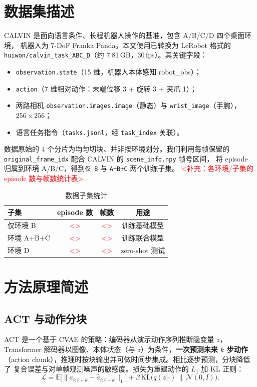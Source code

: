 \documentclass[11pt]{ctexart}
\begin{document}
\section{数据集描述}
CALVIN 是面向语言条件、长程机器人操作的基准，包含 A/B/C/D 四个桌面环境，
机器人为 7-DoF Franka Panda。本文使用已转换为 LeRobot 格式的
\texttt{huiwon/calvin\_task\_ABC\_D}（约 7.81\,GB，30\,fps）。其关键字段：
\begin{itemize}
  \item \texttt{observation.state}（15 维，机器人本体感知 robot\_obs）；
  \item \texttt{action}（7 维相对动作：末端位移 3 + 旋转 3 + 夹爪 1）；
  \item 两路相机 \texttt{observation.images.image}（静态）与 \texttt{wrist\_image}（手腕），$256\times256$；
  \item 语言任务指令（\texttt{tasks.jsonl}，经 \texttt{task\_index} 关联）。
\end{itemize}
数据原始的 4 个分片为均匀切块、并非按环境划分。我们利用每帧保留的
\texttt{original\_frame\_idx} 配合 CALVIN 的 \texttt{scene\_info.npy} 帧号区间，
将 episode 归属到环境 A/B/C，得到\texttt{仅 B} 与 \texttt{A+B+C} 两个训练子集。
\textcolor{red}{<补充：各环境/子集的 episode 数与帧数统计表>}

\begin{table}[h]\centering
\caption{数据子集统计}\label{tab:data}
\begin{tabular}{lccc}
\toprule
子集 & episode 数 & 帧数 & 用途 \\
\midrule
仅环境 B & \textcolor{red}{<>} & \textcolor{red}{<>} & 训练基础模型 \\
环境 A+B+C & \textcolor{red}{<>} & \textcolor{red}{<>} & 训练联合模型 \\
环境 D & \textcolor{red}{<>} & \textcolor{red}{<>} & zero-shot 测试 \\
\bottomrule
\end{tabular}
\end{table}

\section{方法原理简述}
\subsection{ACT 与动作分块}
ACT 是一个基于 CVAE 的策略：编码器从演示动作序列推断隐变量 $z$，
Transformer 解码器以图像、本体状态（与 $z$）为条件，\textbf{一次预测未来 $k$ 步动作}
（action chunk），推理时按块输出并可做时间步集成。相比逐步预测，分块降低了
复合误差与对单帧观测噪声的敏感度。损失为重建动作的 $L_1$ 加 KL 正则：
\begin{equation}
\mathcal{L} = \mathbb{E}\big[\|a_{t:t+k}-\hat a_{t:t+k}\|_1\big] + \beta\, \mathrm{KL}\big(q(z|\cdot)\,\|\,\mathcal{N}(0,I)\big).
\end{equation}
\end{document}
